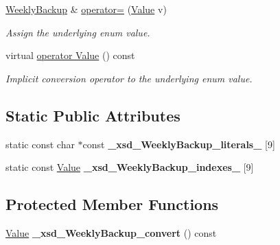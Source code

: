 \begin{DoxyCompactItemize}
\hyperlink{classopenstack_1_1xml_1_1WeeklyBackup}{WeeklyBackup} \& \hyperlink{classopenstack_1_1xml_1_1WeeklyBackup_a782baec6bf6cf9dbb379bd7d8a439bc6}{operator=} (\hyperlink{classopenstack_1_1xml_1_1WeeklyBackup_ac41dd439f5277968c6540768c12ddcb0}{Value} v)
\begin{DoxyCompactList}\small\item\em Assign the underlying enum value. \item\end{DoxyCompactList}\item 
virtual \hyperlink{classopenstack_1_1xml_1_1WeeklyBackup_a4c3609f7d3ef2cf1ef528171054acc74}{operator Value} () const 
\begin{DoxyCompactList}\small\item\em Implicit conversion operator to the underlying enum value. \item\end{DoxyCompactList}\end{DoxyCompactItemize}
\subsection*{Static Public Attributes}
\begin{DoxyCompactItemize}
\item 
\hypertarget{classopenstack_1_1xml_1_1WeeklyBackup_a81bd034762cd3b66932385ecbd08d84a}{
static const char $\ast$const {\bfseries \_\-xsd\_\-WeeklyBackup\_\-literals\_\-} \mbox{[}9\mbox{]}}
\label{classopenstack_1_1xml_1_1WeeklyBackup_a81bd034762cd3b66932385ecbd08d84a}

\item 
\hypertarget{classopenstack_1_1xml_1_1WeeklyBackup_a1789e419a933e873d70c2fd7abf60046}{
static const \hyperlink{classopenstack_1_1xml_1_1WeeklyBackup_ac41dd439f5277968c6540768c12ddcb0}{Value} {\bfseries \_\-xsd\_\-WeeklyBackup\_\-indexes\_\-} \mbox{[}9\mbox{]}}
\label{classopenstack_1_1xml_1_1WeeklyBackup_a1789e419a933e873d70c2fd7abf60046}

\end{DoxyCompactItemize}
\subsection*{Protected Member Functions}
\begin{DoxyCompactItemize}
\item 
\hypertarget{classopenstack_1_1xml_1_1WeeklyBackup_aab3114f7acd3c9d09eb3fc3e2924ab9f}{
\hyperlink{classopenstack_1_1xml_1_1WeeklyBackup_ac41dd439f5277968c6540768c12ddcb0}{Value} {\bfseries \_\-xsd\_\-WeeklyBackup\_\-convert} () const }
\label{classopenstack_1_1xml_1_1WeeklyBackup_aab3114f7acd3c9d09eb3fc3e2924ab9f}

\end{DoxyCompactItemize}


